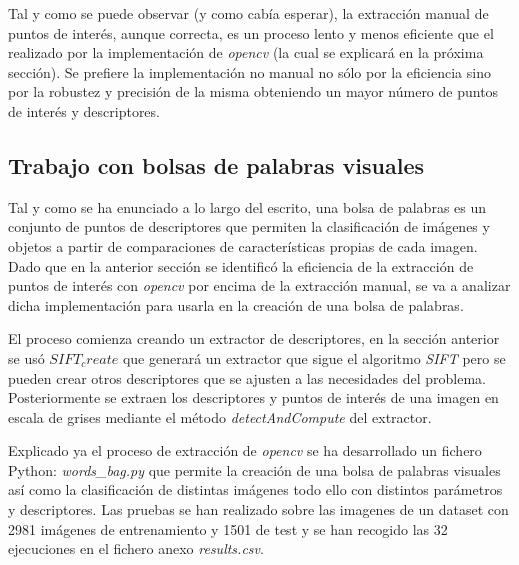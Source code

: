 \documentclass[a4paper,12pt]{article}
\begin{document}
{\vspace{0.5cm}

Tal y como se puede observar (y como cabía esperar), la extracción manual de puntos de interés, aunque correcta, es un proceso lento y menos eficiente que el realizado por la implementación de \textit{opencv} 
(la cual se explicará en la próxima sección). Se prefiere la implementación no manual no sólo por la eficiencia sino por la robustez y precisión de la misma obteniendo un mayor número de puntos de interés y descriptores.

\vspace{0.5cm}

\subsection{Trabajo con bolsas de palabras visuales}

\vspace{0.5cm}

Tal y como se ha enunciado a lo largo del escrito, una bolsa de palabras es un conjunto de puntos de descriptores que permiten la clasificación de imágenes y objetos a partir de comparaciones de características propias de cada imagen.
Dado que en la anterior sección se identificó la eficiencia de la extracción de puntos de interés con \textit{opencv} por encima de la extracción manual, se va a analizar dicha implementación para usarla en la creación de una bolsa de palabras.

\vspace{0.5cm}

El proceso comienza creando un extractor de descriptores, en la sección anterior se usó \textit{$SIFT_create$} que generará un extractor que sigue el algoritmo \textit{SIFT} pero se pueden crear otros descriptores que se ajusten a las necesidades del problema.
Posteriormente se extraen los descriptores y puntos de interés de una imagen en escala de grises mediante el método \textit{detectAndCompute} del extractor. 

\vspace{0.5cm}

Explicado ya el proceso de extracción de \textit{opencv} se ha desarrollado un fichero Python: \textit{words\_bag.py} que permite la creación de una bolsa de palabras visuales así como la clasificación de distintas imágenes todo ello con 
distintos parámetros y descriptores. Las pruebas se han realizado sobre las imagenes de un dataset con 2981 imágenes de entrenamiento y 1501 de test y se han recogido las 32 ejecuciones en el fichero anexo \textit{results.csv}.

}
\end{document}
